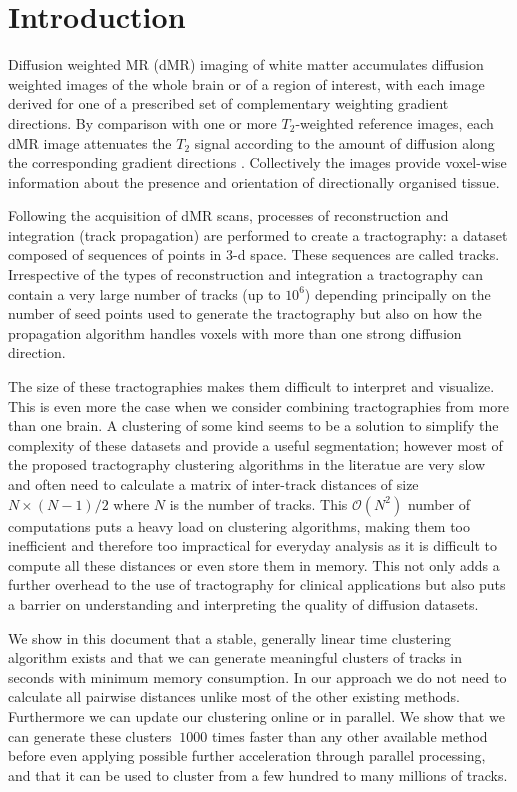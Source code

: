 \documentclass[preprint,authoryear,a4paper,10pt,onecolumn]{elsarticle}
\begin{document}
\section{Introduction}

Diffusion weighted MR (dMR) imaging of white matter accumulates diffusion
weighted images of the whole brain or of a region of interest, with each
image derived for one of a prescribed set of complementary weighting
gradient directions. By comparison with one or more $T_{2}$-weighted
reference images, each dMR image attenuates the $T_{2}$ signal according
to the amount of diffusion along the corresponding gradient directions
\citep{DiffMRIBook}. Collectively the images provide voxel-wise
information about the presence and orientation of directionally
organised tissue.

Following the acquisition of dMR scans, processes of reconstruction and
integration (track propagation) are performed to create a tractography:
a dataset composed of sequences of points in 3-d space. These sequences
are called tracks. Irrespective of the types of reconstruction and
integration a tractography can contain a very large number of tracks (up
to $10^6$) depending principally on the number of seed points used to
generate the tractography but also on how the propagation algorithm
handles voxels with more than one strong diffusion direction.

The size of these tractographies makes them difficult to interpret and
visualize. This is even more the case when we consider combining
tractographies from more than one brain. A clustering of some kind seems
to be a solution to simplify the complexity of these datasets and
provide a useful segmentation; however most of the proposed tractography
clustering algorithms in the literatue are very slow and often need to
calculate a matrix of inter-track distances of size $N\times (N-1)/2$
where $N$ is the number of tracks. This $\mathcal{O}(N^2)$ number of
computations puts a heavy load on clustering algorithms, making them too
inefficient and therefore too impractical for everyday analysis as it is
difficult to compute all these distances or even store them in
memory. This not only adds a further overhead to the use of tractography
for clinical applications but also puts a barrier on understanding and
interpreting the quality of diffusion datasets.

We show in this document that a stable, generally linear time clustering
algorithm exists and that we can generate meaningful clusters of tracks
in seconds with minimum memory consumption. In our approach we do not
need to calculate all pairwise distances unlike most of the other
existing methods. Furthermore we can update our clustering online or in
parallel. We show that we can generate these clusters $~1000$ times
faster than any other available method before even applying possible
further acceleration through parallel processing, and that it can be
used to cluster from a few hundred to many millions of tracks.
\end{document}
